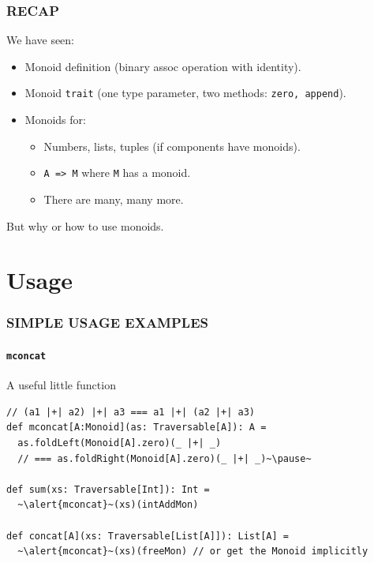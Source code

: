 \documentclass{beamer}
\begin{document}
\begin{frame} \frametitle{RECAP}
  We have seen:
  \begin{itemize}
    \item Monoid definition (binary assoc operation with identity).
    \item Monoid \texttt{trait} (one type parameter,
      two methods: \texttt{zero, append}).
    \item Monoids for:
      \begin{itemize}
      \item Numbers, lists, tuples (if components have monoids).
      \item \texttt{A => M} where \texttt{M} has a monoid.
      \item There are many, many more.
      \end{itemize}
  \end{itemize}

  \begin{block}{}
    \centering
    But \alert{why} or \alert{how} to use monoids.
  \end{block}
\end{frame}

\section{Usage}
\begin{frame}[fragile] \frametitle{SIMPLE USAGE EXAMPLES}
  \framesubtitle{\texttt{mconcat}}

  \begin{block}{A useful little function}
  \begin{lstlisting}
// (a1 |+| a2) |+| a3 === a1 |+| (a2 |+| a3)
def mconcat[A:Monoid](as: Traversable[A]): A =
  as.foldLeft(Monoid[A].zero)(_ |+| _)
  // === as.foldRight(Monoid[A].zero)(_ |+| _)~\pause~

def sum(xs: Traversable[Int]): Int =
  ~\alert{mconcat}~(xs)(intAddMon)

def concat[A](xs: Traversable[List[A]]): List[A] =
  ~\alert{mconcat}~(xs)(freeMon) // or get the Monoid implicitly
  \end{lstlisting}
  \end{block}
\end{frame}
\end{document}
